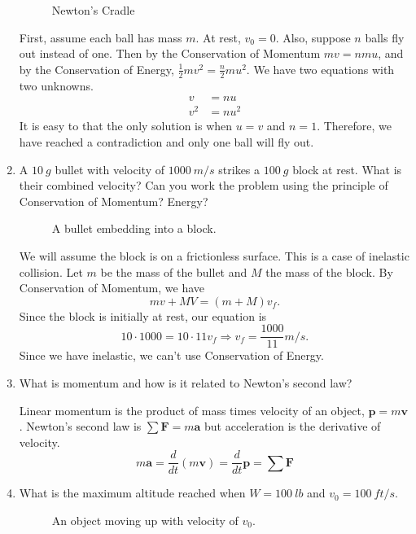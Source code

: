 \begin{enumerate}
  \begin{figure}[H]
    \centering
    
    \caption{Newton's Cradle}
  \end{figure}
  First, assume each ball has mass \(m\).
  At rest, \(v_0 = 0\).
  Also, suppose \(n\) balls fly out instead of one.
  Then by the Conservation of Momentum \(mv = nmu\), and by the Conservation of
  Energy, \(\frac{1}{2}mv^2 = \frac{n}{2}mu^2\).
  We have two equations with two unknowns.
  \begin{align*}
    v &= nu\\
    v^2 &= nu^2
  \end{align*}
  It is easy to that the only solution is when \(u = v\) and \(n = 1\).
  Therefore, we have reached a contradiction and only one ball will fly out.
\item
  A \(10 \ g\) bullet with velocity of \(1000 \ m/s\) strikes a \(100 \ g\)
  block at rest.
  What is their combined velocity?
  Can you work the problem using the principle of Conservation of Momentum?
  Energy?
  \begin{figure}[H]
    \centering
    
    \caption{A bullet embedding into a block.}
  \end{figure}
  We will assume the block is on a frictionless surface.
  This is a case of inelastic collision.
  Let \(m\) be the mass of the bullet and \(M\) the mass of the block.
  By Conservation of Momentum, we have
  \[
  mv + MV = (m + M)v_f.
  \]
  Since the block is initially at rest, our equation is
  \[
  10\cdot 1000 = 10\cdot 11v_f\Rightarrow v_f = \frac{1000}{11}m/s.
  \]
  Since we have inelastic, we can't use Conservation of Energy.
\item
  What is momentum and how is it related to Newton's second law?
  \par\smallskip
  Linear momentum is the product of mass times velocity of an object,
  \(\mathbf{p} = m\mathbf{v}\).
  Newton's second law is \(\sum\mathbf{F} = m\mathbf{a}\) but acceleration
  is the derivative of velocity.
  \[
  m\mathbf{a} = \frac{d}{dt}(m\mathbf{v}) = \frac{d}{dt}\mathbf{p} =
  \sum\mathbf{F}
  \]
\item
  What is the maximum altitude reached when \(W = 100 \ lb\) and
  \(v_0 = 100 \ ft/s\).
  \begin{figure}[H]
    \centering
    
    \caption{An object moving up with velocity of \(v_0\).}

\end{figure}
\end{enumerate}
